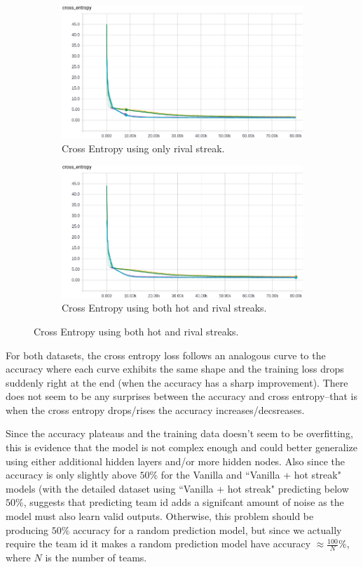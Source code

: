 \documentclass{article} %
\begin{document}
\begin{figure}[!htb]
  \begin{subfigure}{0.5\textwidth}
    \includegraphics[width=\linewidth]{plots/model1/wteam_onehot/streak-r/crossentropy.png}
    \caption{Cross Entropy using only rival streak.}\label{fig:wteam-onehot-r-crossentropy}
  \end{subfigure}
  \begin{subfigure}{0.5\textwidth}
    \includegraphics[width=\linewidth]{plots/model1/wteam_onehot/streak-hr/crossentropy.png}
    \caption{Cross Entropy using both hot and rival streaks.}\label{fig:wteam-onehot-hr-crossentropy}
  \end{subfigure}
\end{figure}
For both datasets, the cross entropy loss follows an analogous curve to the accuracy where each curve exhibits the same shape and the training loss drops suddenly right at the end (when the accuracy has a sharp improvement).
There does not seem to be any surprises between the accuracy and cross entropy--that is when the cross entropy drops/rises the accuracy increases/decsreases.


Since the accuracy plateaus and the training data doesn't seem to be overfitting, this is evidence that the model is not complex enough and could better generalize using either additional hidden layers and/or more hidden nodes.
Also since the accuracy is only slightly above $50\%$ for the Vanilla and ``Vanilla + hot streak" models (with the detailed dataset using ``Vanilla + hot streak" predicting below $50\%$, suggests that predicting team id adds a signifcant amount of noise as the model must also learn valid outputs.
Otherwise, this problem should be producing $50\%$ accuracy for a random prediction model, but since we actually require the team id it makes a random prediction model have accuracy $\approx \frac{100}{N}\%$, where $N$ is the number of teams.
\end{document}
